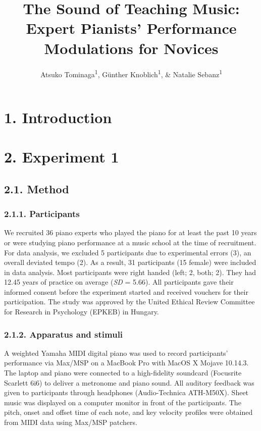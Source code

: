 \documentclass[
  english,
  man,floatsintext]{apa6}
\author{Atsuko Tominaga\textsuperscript{1}, Günther Knoblich\textsuperscript{1}, \& Natalie Sebanz\textsuperscript{1}}
\affiliation{
\vspace{0.5cm}
\textsuperscript{1} Department of Cognitive Science, Central European University}
\title{The Sound of Teaching Music: Expert Pianists' Performance Modulations for Novices}
\date{}
\begin{document}
\maketitle

\hypertarget{introduction}{%
\section{1. Introduction}\label{introduction}}

\hypertarget{experiment-1}{%
\section{2. Experiment 1}\label{experiment-1}}

\hypertarget{method}{%
\subsection{2.1. Method}\label{method}}

\hypertarget{participants}{%
\subsubsection{2.1.1. Participants}\label{participants}}

We recruited 36 piano experts who played the piano for at least the past 10 years or were studying piano performance at a music school at the time of recruitment. For data analysis, we excluded 5 participants due to experimental errors (3), an overall deviated tempo (2). As a result, 31 participants (15 female) were included in data analysis. Most participants were right handed (left; 2, both; 2). They had 12.45 years of practice on average (\emph{SD} = 5.66). All participants gave their informed consent before the experiment started and received vouchers for their participation. The study was approved by the United Ethical Review Committee for Research in Psychology (EPKEB) in Hungary.

\hypertarget{apparatus-and-stimuli}{%
\subsubsection{2.1.2. Apparatus and stimuli}\label{apparatus-and-stimuli}}

A weighted Yamaha MIDI digital piano was used to record participants' performance via Max/MSP on a MacBook Pro with MacOS X Mojave 10.14.3. The laptop and piano were connected to a high-fidelity soundcard (Focusrite Scarlett 6i6) to deliver a metronome and piano sound. All auditory feedback was given to participants through headphones (Audio-Technica ATH-M50X). Sheet music was displayed on a computer monitor in front of the participants. The pitch, onset and offset time of each note, and key velocity profiles were obtained from MIDI data using Max/MSP patchers.
\end{document}
